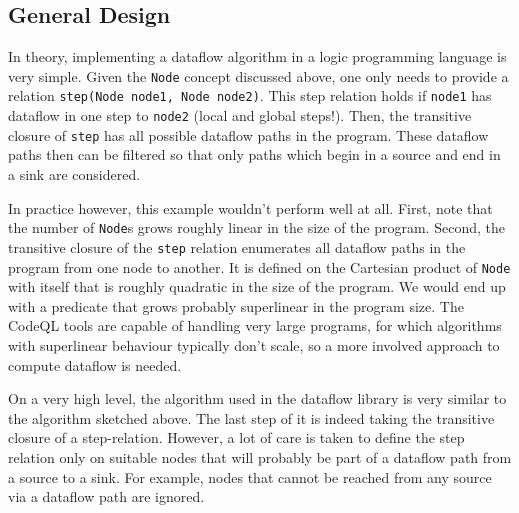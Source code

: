 \subsection{General Design}

In theory, implementing a dataflow algorithm in a logic programming language is very simple.
Given the \texttt{Node} concept discussed above, one only needs to provide a relation
\texttt{step(Node node1, Node node2)}.
This step relation holds if \texttt{node1} has dataflow in one step to \texttt{node2}
(local and global steps!).
Then, the transitive closure of \texttt{step} has all possible dataflow paths in the program.
These dataflow paths then can be filtered so that only paths which begin in a source and 
end in a sink are considered.

In practice however, this example wouldn't perform well at all.
First, note that the number of \texttt{Node}s grows roughly linear in the size of
the program.
Second, the transitive closure of the \texttt{step} relation enumerates all dataflow
paths in the program from one node to another.
It is defined on the Cartesian product of \texttt{Node} with itself that is roughly quadratic 
in the size of the program.
We would end up with a predicate that grows probably superlinear in the program size.
The CodeQL tools are capable of handling very large programs,
for which algorithms with superlinear behaviour typically don't scale,
so a more involved approach to compute dataflow is needed.

On a very high level, the algorithm used in the dataflow library is very similar 
to the algorithm sketched above.
The last step of it is indeed taking the transitive closure of a step-relation.
However, a lot of care is taken to define the step relation only on suitable 
nodes that will probably be part of a dataflow path from a source to a sink.
For example, nodes that cannot be reached from any source via a dataflow path 
are ignored.

